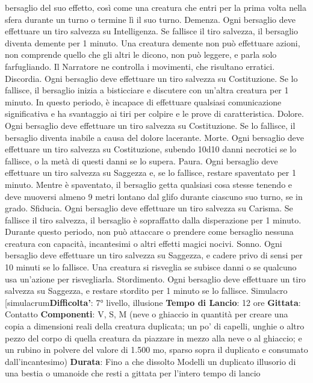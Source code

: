 \begin{multicols}{2}
bersaglio del suo effetto, così come una creatura che
entri per la prima volta nella sfera durante un turno o
termine lì il suo turno.
Demenza. Ogni bersaglio deve effettuare un tiro
salvezza su Intelligenza. Se fallisce il tiro salvezza, il
bersaglio diventa demente per 1 minuto. Una creatura
demente non può effettuare azioni, non comprende
quello che gli altri le dicono, non può leggere, e parla
solo farfugliando. Il Narratore ne controlla i movimenti, che
risultano erratici.
Discordia. Ogni bersaglio deve effettuare un tiro
salvezza su Costituzione. Se lo fallisce, il bersaglio
inizia a bisticciare e discutere con un’altra creatura per
1 minuto. In questo periodo, è incapace di effettuare
qualsiasi comunicazione significativa e ha svantaggio ai
tiri per colpire e le prove di caratteristica.
Dolore. Ogni bersaglio deve effettuare un tiro salvezza
su Costituzione. Se lo fallisce, il bersaglio diventa
inabile a causa del dolore lacerante.
Morte. Ogni bersaglio deve effettuare un tiro salvezza
su Costituzione, subendo 10d10 danni necrotici se lo
fallisce, o la metà di questi danni se lo supera.
Paura. Ogni bersaglio deve effettuare un tiro salvezza
su Saggezza e, se lo fallisce, restare spaventato per 1
minuto. Mentre è spaventato, il bersaglio getta qualsiasi
cosa stesse tenendo e deve muoversi almeno 9 metri
lontano dal glifo durante ciascuno suo turno, se in
grado.
Sfiducia. Ogni bersaglio deve effettuare un tiro
salvezza su Carisma. Se fallisce il tiro salvezza, il
bersaglio è sopraffatto dalla disperazione per 1 minuto.
Durante questo periodo, non può attaccare o prendere
come bersaglio nessuna creatura con capacità,
incantesimi o altri effetti magici nocivi.
Sonno. Ogni bersaglio deve effettuare un tiro salvezza
su Saggezza, e cadere privo di sensi per 10 minuti se lo
fallisce. Una creatura si risveglia se subisce danni o se
qualcuno usa un’azione per risvegliarla.
Stordimento. Ogni bersaglio deve effettuare un tiro
salvezza su Saggezza, e restare stordito per 1 minuto
se lo fallisce.
Simulacro
[simulacrum\textbf{Difficolta'}:
7° livello, illusione
\textbf{Tempo di Lancio}: 12 ore
\textbf{Gittata}: Contatto
\textbf{Componenti}: V, S, M (neve o ghiaccio in quantità per
creare una copia a dimensioni reali della creatura
duplicata; un po’ di capelli, unghie o altro pezzo del
corpo di quella creatura da piazzare in mezzo alla neve
o al ghiaccio; e un rubino in polvere del valore di 1.500
mo, sparso sopra il duplicato e consumato
dall’incantesimo)
\textbf{Durata}: Fino a che dissolto
Modelli un duplicato illusorio di una bestia o umanoide
che resti a gittata per l’intero tempo di lancio

\end{multicols}
